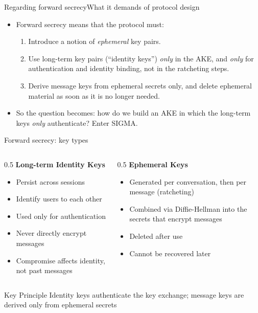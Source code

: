 \ifdefined\PRESENTATION\else\PassOptionsToClass{handout}{beamer}\fi\documentclass[aspectratio=169, lualatex]{beamer}
\begin{document}
\begin{frame}{Regarding forward secrecy}{What it demands of protocol design}
	\begin{itemize}
		\item Forward secrecy means that the protocol must:
		      \begin{enumerate}
			      \item Introduce a notion of \textit{ephemeral} key pairs.
			      \item Use long-term key pairs (``identity keys'') \textit{only} in the AKE, and \textit{only} for authentication and identity binding, not in the ratcheting steps.
			      \item Derive message keys from ephemeral secrets only, and delete ephemeral material as soon as it is no longer needed.
		      \end{enumerate}
		\item So the question becomes: how do we build an AKE in which the long-term keys \textit{only} authenticate? Enter SIGMA.
	\end{itemize}
\end{frame}

\begin{frame}{Forward secrecy: key types}
	\begin{columns}
		\begin{column}{0.5\textwidth}
			\textbf{Long-term Identity Keys}
			\begin{itemize}
				\item Persist across sessions
				\item Identify users to each other
				\item Used only for authentication
				\item Never directly encrypt messages
				\item Compromise affects identity, not past messages
			\end{itemize}
		\end{column}
		\begin{column}{0.5\textwidth}
			\textbf{Ephemeral Keys}
			\begin{itemize}
				\item Generated per conversation, then per message (ratcheting)
				\item Combined via Diffie-Hellman into the secrets that encrypt messages
				\item Deleted after use
				\item Cannot be recovered later
			\end{itemize}
		\end{column}
	\end{columns}
	\begin{alertblock}{Key Principle}
		Identity keys authenticate the key exchange; message keys are derived only from ephemeral secrets
	\end{alertblock}
\end{frame}
\end{document}
